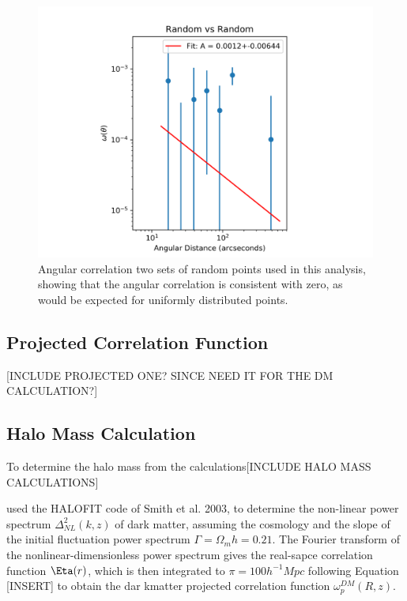 \begin{figure}[tbp]
\centering \includegraphics[width=120mm]{clustering/Log_Random_vs_Random_15000NoParenFlip_bin10.png}
\caption{Angular correlation two sets of random points used in this analysis, showing that the angular correlation is consistent with zero, as would be expected for uniformly distributed points.}
\label{fig:random_points}
\end{figure}

\subsection{Projected Correlation Function}

[INCLUDE PROJECTED ONE? SINCE NEED IT FOR THE DM CALCULATION?]

\subsection{Halo Mass Calculation}

To determine the halo mass from the calculations[INCLUDE HALO MASS CALCULATIONS]

\cite{hickox2011clustering} used the HALOFIT code of Smith et al. 2003, to determine the non-linear power spectrum $\Delta_{NL}^2(k,z)$ of dark matter, assuming the cosmology and the slope of the initial fluctuation power spectrum $\Gamma = \Omega_mh = 0.21$. The Fourier transform of the nonlinear-dimensionless power spectrum gives the real-sapce correlation function $\Eta(r)$, which is then integrated to $\pi = 100 h^{-1} Mpc$ following Equation [INSERT] to obtain the dar kmatter projected correlation function $\omega^{DM}_p(R,z)$.

